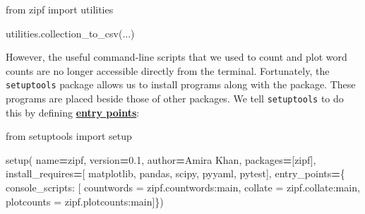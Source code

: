 \documentclass[
]{krantz}
\makeatletter
\newenvironment{Shaded}{\begin{snugshade}}{\end{snugshade}}
\newcommand{\ImportTok}[1]{#1}
\newcommand{\NormalTok}[1]{#1}
\newcommand{\OperatorTok}[1]{\textcolor[rgb]{0.81,0.36,0.00}{\textbf{#1}}}
\newcommand{\StringTok}[1]{\textcolor[rgb]{0.31,0.60,0.02}{#1}}
\newenvironment{kframe}{%
\medskip{}
\setlength{\fboxsep}{.8em}
 \def\at@end@of@kframe{}%
 \ifinner\ifhmode%
  \def\at@end@of@kframe{\end{minipage}}%
  \begin{minipage}{\columnwidth}%
 \fi\fi%
 \def\FrameCommand##1{\hskip\@totalleftmargin \hskip-\fboxsep
 \colorbox{shadecolor}{##1}\hskip-\fboxsep
     \hskip-\linewidth \hskip-\@totalleftmargin \hskip\columnwidth}%
 \MakeFramed {\advance\hsize-\width
   \@totalleftmargin\z@ \linewidth\hsize
   \@setminipage}}%
 {\par\unskip\endMakeFramed%
 \at@end@of@kframe}
\renewenvironment{Shaded}{\begin{kframe}}{\end{kframe}}
\newcommand{\gref}[2]{\hyperlink{#2}{\textbf{#1}}}
\makeatother
\begin{document}
\begin{Shaded}
\begin{Highlighting}[]
\ImportTok{from}\NormalTok{ zipf }\ImportTok{import}\NormalTok{ utilities}


\NormalTok{utilities.collection\_to\_csv(...)}
\end{Highlighting}
\end{Shaded}

However,
the useful command-line scripts that we used to count and plot word counts
are no longer accessible directly from the terminal.
Fortunately,
the \texttt{setuptools} package allows us to install programs along with the package.
These programs are placed beside those of other packages.
We tell \texttt{setuptools} to do this by defining
\gref{entry points}{entry\_point}:

\begin{Shaded}
\begin{Highlighting}[]
\ImportTok{from}\NormalTok{ setuptools }\ImportTok{import}\NormalTok{ setup}


\NormalTok{setup(}
\NormalTok{    name}\OperatorTok{=}\StringTok{\textquotesingle{}zipf\textquotesingle{}}\NormalTok{,}
\NormalTok{    version}\OperatorTok{=}\StringTok{\textquotesingle{}0.1\textquotesingle{}}\NormalTok{,}
\NormalTok{    author}\OperatorTok{=}\StringTok{\textquotesingle{}Amira Khan\textquotesingle{}}\NormalTok{,}
\NormalTok{    packages}\OperatorTok{=}\NormalTok{[}\StringTok{\textquotesingle{}zipf\textquotesingle{}}\NormalTok{],}
\NormalTok{    install\_requires}\OperatorTok{=}\NormalTok{[}
        \StringTok{\textquotesingle{}matplotlib\textquotesingle{}}\NormalTok{,}
        \StringTok{\textquotesingle{}pandas\textquotesingle{}}\NormalTok{,}
        \StringTok{\textquotesingle{}scipy\textquotesingle{}}\NormalTok{,}
        \StringTok{\textquotesingle{}pyyaml\textquotesingle{}}\NormalTok{,}
        \StringTok{\textquotesingle{}pytest\textquotesingle{}}\NormalTok{],}
\NormalTok{    entry\_points}\OperatorTok{=}\NormalTok{\{}
        \StringTok{\textquotesingle{}console\_scripts\textquotesingle{}}\NormalTok{: [}
            \StringTok{\textquotesingle{}countwords = zipf.countwords:main\textquotesingle{}}\NormalTok{,}
            \StringTok{\textquotesingle{}collate = zipf.collate:main\textquotesingle{}}\NormalTok{,}
            \StringTok{\textquotesingle{}plotcounts = zipf.plotcounts:main\textquotesingle{}}\NormalTok{]\})}
\end{Highlighting}
\end{Shaded}
\end{document}
